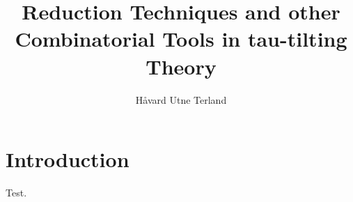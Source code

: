 \documentclass[]{article}
\title{Reduction Techniques and other Combinatorial Tools in tau-tilting Theory}
\author{Håvard Utne Terland}
\begin{document}
\maketitle

\begin{abstract}

\end{abstract}

\section{Introduction}
Test\cite{tau}.




\printbibliography
\end{document}
